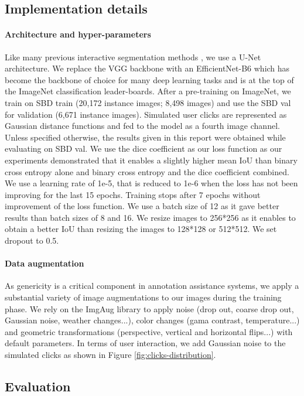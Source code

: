 \documentclass[letterpaper, 10 pt, conference]{ieeeconf}
\begin{document}
\subsection{Implementation details}

\paragraph{Architecture and hyper-parameters} 
Like many previous interactive segmentation methods \cite{bredell18}, we use a U-Net \cite{ronneberger15} architecture. We replace the VGG backbone with an EfficientNet-B6 \cite{tan19} which has become the backbone of choice for many deep learning tasks and is at the top of the ImageNet classification leader-boards. After a pre-training on ImageNet, we train on SBD train (20,172 instance images; 8,498 images) and use the SBD val for validation (6,671 instance images). Simulated user clicks are represented as Gaussian distance functions and fed to the model as a fourth image channel. Unless specified otherwise, the results given in this report were obtained while evaluating on SBD val.
We use the dice coefficient as our loss function as our experiments demonstrated that it enables a slightly higher mean IoU than binary cross entropy alone and binary cross entropy and the dice coefficient combined. We use a learning rate of 1e-5, that is reduced to 1e-6 when the loss has not been improving for the last 15 epochs. Training stops after 7 epochs without improvement of the loss function. We use a batch size of 12 as it gave better results than batch sizes of 8 and 16. We resize images to 256*256 as it enables to obtain a better IoU than resizing the images to 128*128 or 512*512. We set dropout to 0.5.

\paragraph{Data augmentation} As genericity is a critical component in annotation assistance systems, we apply a substantial variety of image augmentations to our images during the training phase. We rely on the ImgAug \cite{imgaug} library to apply noise (drop out, coarse drop out, Gaussian noise, weather changes...), color changes (gama contrast, temperature...) and geometric transformations (perspective, vertical and horizontal flips...) with default parameters. In terms of user interaction, we add Gaussian noise to the simulated clicks as shown in Figure \ref{fig:clicks-distribution}.

\subsection{Evaluation}
\end{document}
